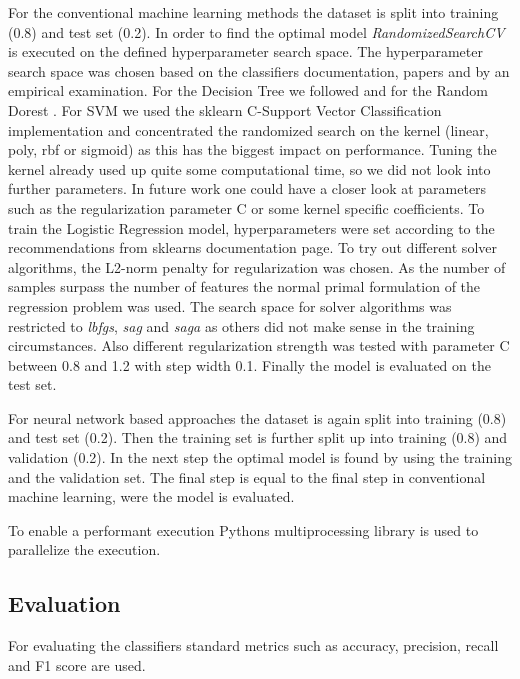 For the conventional machine learning methods the dataset is split into training (0.8) and test set (0.2). In order to find the optimal model \textit{Randomized\-SearchCV} is executed on the defined hyperparameter search space. The hyperparameter search space was chosen based on the classifiers doc\-u\-men\-ta\-tion, papers and by an empirical examination. For the Decision Tree we followed \cite{mantovani2019empirical} and for the Random Dorest \cite{probstHyperparametersTuningStrategies2019}. For SVM we used the sklearn C-Support Vector Classification implementation and concentrated the randomized search on the kernel (linear, poly, rbf or sigmoid) as this has the biggest impact on performance. Tuning the kernel already used up quite some computational time, so we did not look into further parameters. In future work one could have a closer look at parameters such as the regularization parameter C or some kernel specific coefficients. To train the Logistic Regression model, hyperparameters were set according to the recommendations from sklearns documentation page. To try out different solver algorithms, the L2-norm penalty for regularization was chosen. As the number of samples surpass the number of features the normal primal formulation of the regression problem was used. The search space for solver algorithms was restricted to \textit{lbfgs}, \textit{sag} and \textit{saga} as others did not make sense in the training circumstances. Also different regularization strength was tested with parameter C between 0.8 and 1.2 with step width 0.1. Finally the model is evaluated on the test set.

For neural network based approaches the dataset is again split into training (0.8) and test set (0.2). Then the training set is further split up into training (0.8) and validation (0.2). In the next step the optimal model is found by using the training and the validation set. The final step is equal to the final step in conventional machine learning, were the model is evaluated.

To enable a performant execution Pythons multiprocessing library is used to parallelize the execution.

\subsection{Evaluation}
\label{ch:approachE}

For evaluating the classifiers standard metrics such as accuracy, precision, recall and F1 score are used.

